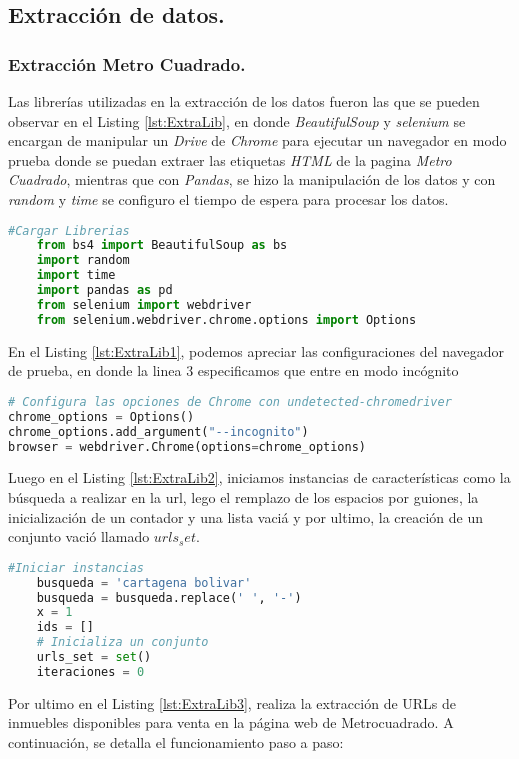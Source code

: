 \documentclass[12pt,a4paper]{article}
\begin{document}
\subsection{Extracción de datos.}
\subsubsection{Extracción Metro Cuadrado.}
Las librerías utilizadas en la extracción de los datos fueron las que se pueden observar en el Listing \ref{lst:ExtraLib}, en donde \textit{BeautifulSoup} y \textit{selenium} se encargan de manipular un \textit{Drive} de \textit{Chrome} para ejecutar un navegador en modo prueba donde se puedan extraer las etiquetas \textit{HTML} de la pagina \textit{Metro Cuadrado}, mientras que con \textit{Pandas}, se hizo la manipulación de los datos y con \textit{random} y \textit{time} se configuro el tiempo de espera para procesar los datos.
\begin{lstlisting}[language=Python, caption={Librerias Cargadas para la extracción}, label={lst:ExtraLib}]
	#Cargar Librerias
	from bs4 import BeautifulSoup as bs
	import random
	import time
	import pandas as pd
	from selenium import webdriver
	from selenium.webdriver.chrome.options import Options
\end{lstlisting}

En el Listing \ref{lst:ExtraLib1}, podemos apreciar las configuraciones del navegador de prueba, en donde la linea 3 especificamos que entre en modo incógnito
\begin{lstlisting}[language=Python, caption={Configuración del navegador}, label={lst:ExtraLib1}]
# Configura las opciones de Chrome con undetected-chromedriver
chrome_options = Options()
chrome_options.add_argument("--incognito")
browser = webdriver.Chrome(options=chrome_options)
\end{lstlisting}

Luego en el Listing \ref{lst:ExtraLib2}, iniciamos instancias de características como la búsqueda a realizar en la url, lego el remplazo de los espacios por guiones, la inicialización de un contador y una lista vaciá y por ultimo, la creación de un conjunto vació llamado $urls_set$.


\begin{lstlisting}[language=Python, caption={Inicializador de instancias}, label={lst:ExtraLib2}]
	#Iniciar instancias
	busqueda = 'cartagena bolivar'
	busqueda = busqueda.replace(' ', '-')
	x = 1
	ids = []
	# Inicializa un conjunto
	urls_set = set()
	iteraciones = 0
\end{lstlisting}
Por ultimo en el Listing \ref{lst:ExtraLib3}, realiza la extracción de URLs de inmuebles disponibles para venta en la página web de Metrocuadrado. A continuación, se detalla el funcionamiento paso a paso:
\end{document}
